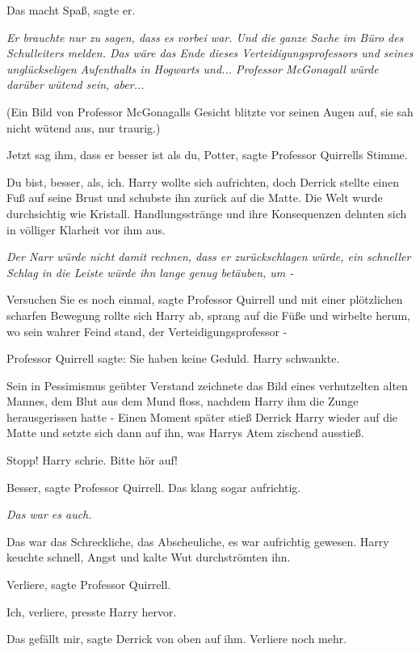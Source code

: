 \glqq Das macht Spaß\grqq{}, sagte er.

\emph{Er brauchte nur zu sagen, dass es vorbei war. Und die ganze Sache im Büro
des Schulleiters melden. Das wäre das Ende dieses Verteidigungsprofessors und
seines unglückseligen Aufenthalts in Hogwarts und... Professor McGonagall würde
darüber wütend sein, aber...}

(Ein Bild von Professor McGonagalls Gesicht blitzte vor seinen Augen auf, sie
sah nicht wütend aus, nur traurig.)

\glqq Jetzt sag ihm, dass er besser ist als du, Potter\grqq{}, sagte Professor
Quirrells Stimme.

\glqq Du bist, besser, als, ich.\grqq{} Harry wollte sich aufrichten, doch
Derrick stellte einen Fuß auf seine Brust und schubste ihn zurück auf die Matte.
Die Welt wurde durchsichtig wie Kristall. Handlungsstränge und ihre Konsequenzen
dehnten sich in völliger Klarheit vor ihm aus.

\emph{Der Narr würde nicht damit rechnen, dass er zurückschlagen würde, ein
schneller Schlag in die Leiste würde ihn lange genug betäuben, um -}

\glqq Versuchen Sie es noch einmal\grqq{}, sagte Professor Quirrell und mit
einer plötzlichen scharfen Bewegung rollte sich Harry ab, sprang auf die Füße
und wirbelte herum, wo sein wahrer Feind stand, der Verteidigungsprofessor -

Professor Quirrell sagte: \glqq Sie haben keine Geduld.\grqq{} Harry schwankte.

Sein in Pessimismus geübter Verstand zeichnete das Bild eines verhutzelten alten
Mannes, dem Blut aus dem Mund floss, nachdem Harry ihm die Zunge herausgerissen
hatte - Einen Moment später stieß Derrick Harry wieder auf die Matte und setzte
sich dann auf ihn, was Harrys Atem zischend ausstieß.

\glqq Stopp!\grqq{} Harry schrie. \glqq Bitte hör auf!\grqq{}

\glqq Besser\grqq{}, sagte Professor Quirrell. \glqq Das klang sogar
aufrichtig.\grqq{}

\emph{Das war es auch.}

Das war das Schreckliche, das Abscheuliche, es war aufrichtig gewesen. Harry
keuchte schnell, Angst und kalte Wut durchströmten ihn.

\glqq Verliere\grqq{}, sagte Professor Quirrell.

\glqq Ich, verliere\grqq{}, presste Harry hervor.

\glqq Das gefällt mir\grqq{}, sagte Derrick von oben auf ihm. \glqq Verliere
noch mehr.\grqq{}

